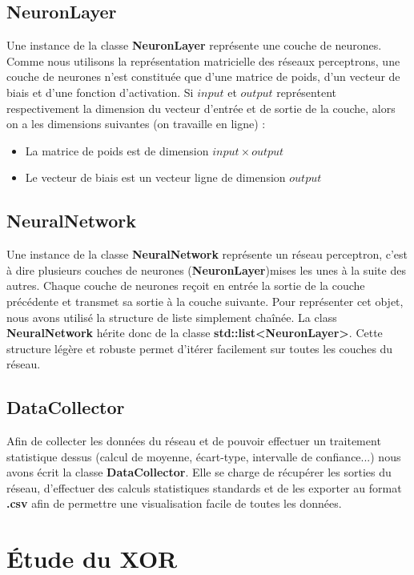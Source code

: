 \subsection{NeuronLayer}

Une instance de la classe \textbf{NeuronLayer} représente une couche de neurones. Comme nous utilisons la représentation matricielle des réseaux perceptrons, une couche de neurones n'est constituée que d'une matrice de poids, d'un vecteur de biais et d'une fonction d'activation. Si $input$ et $output$ représentent respectivement la dimension du vecteur d'entrée et de sortie de la couche, alors on a les dimensions suivantes (on travaille en ligne) :
\begin{itemize}
	\item La matrice de poids est de dimension $input \times output$
	\item Le vecteur de biais est un vecteur ligne de dimension $output$
\end{itemize}

\subsection{NeuralNetwork}

Une instance de la classe \textbf{NeuralNetwork} représente un réseau perceptron, c'est à dire plusieurs couches de neurones (\textbf{NeuronLayer})mises les unes à la suite des autres. Chaque couche de neurones reçoit en entrée la sortie de la couche précédente et transmet sa sortie à la couche suivante. 
Pour représenter cet objet, nous avons utilisé la structure de liste simplement chaînée. La class \textbf{NeuralNetwork} hérite donc de la classe \textbf{std::list<NeuronLayer>}. Cette structure légère et robuste permet d'itérer facilement sur toutes les couches du réseau. 

\subsection{DataCollector}

Afin de collecter les données du réseau et de pouvoir effectuer un traitement statistique dessus (calcul de moyenne, écart-type, intervalle de confiance...) nous avons écrit la classe \textbf{DataCollector}. Elle se charge de récupérer les sorties du réseau, d'effectuer des calculs statistiques standards et de les exporter au format \textbf{.csv} afin de permettre une visualisation facile de toutes les données.

\section{Étude du XOR}

